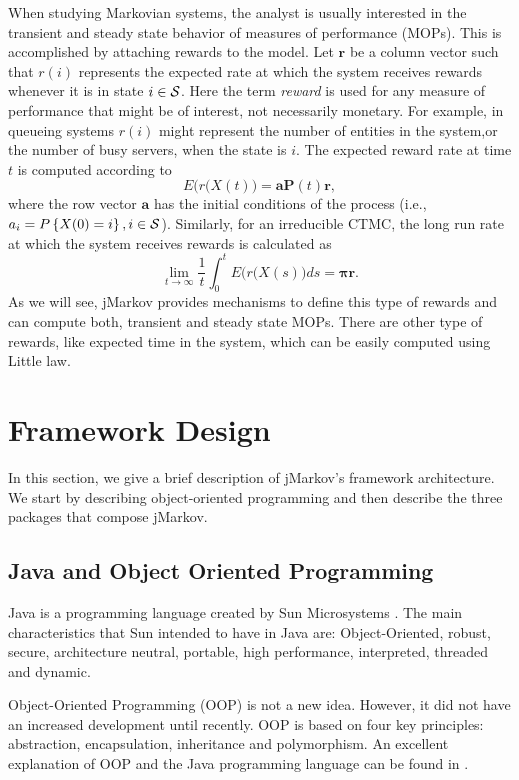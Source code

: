 \documentclass[11pt,letterpaper]{article}
\newcommand{\bP}{{\mathbf P}}
\newcommand{\ba}{{\mathbf a}}
\newcommand{\bpi}{{\boldsymbol{\pi}}}
\newcommand{\cS}{{\cal S}}
\renewcommand{\Pr}[1]{P\left\{#1\right\}}
\newcommand{\br}{\mathbf{r}}
\begin{document}
When studying Markovian systems, the analyst is usually interested in the
transient and steady state behavior of measures of performance (MOPs).  This is
accomplished by attaching rewards to the model.  Let $\br$ be a column vector
such that $r(i)$ represents the expected rate at which the system receives
rewards whenever it is in state $i\in\cS$.  Here the term \emph{reward} is used
for any measure of performance that might be of interest, not necessarily
monetary.  For example, in queueing systems $r(i)$ might represent the number of
entities in the system,or the number of busy servers, when the state is $i$.
The expected reward rate at time $t$ is computed according to
\[ E\big(r(X(t)\big) = \ba\bP(t)\br,\]
where the row vector $\ba$ has the initial conditions of the process (i.e.,
$a_i=\Pr{X(0)=i},i\in\cS$).  Similarly, for an irreducible CTMC, the long run
rate at which the system receives rewards is calculated as
\[\lim_{t\rightarrow\infty} \frac1t\int_0^t E\big(r(X(s)\big) ds = \bpi
\br.\]
As we will see, jMarkov provides mechanisms to define this type of rewards and
can compute both, transient and steady state MOPs.  There are other type of
rewards, like expected time in the system, which can be easily computed using
Little law.


\section{Framework Design}\label{sec:Design}
In this section, we give a brief description of jMarkov's framework
architecture.  We start by describing object-ori\-ented programming and then
describe the three packages that compose jMarkov.


\subsection{Java and Object Oriented Programming}\label{sec:OOP}


Java is a programming language created by Sun Microsystems \cite{sun06}.  The
main characteristics that Sun intended to have in Java are: Object-Oriented,
robust, secure, architecture neutral, portable, high performance, interpreted,
threa\-ded and dynamic.

Object-Oriented Programming  (OOP)
is not a new idea.  However, it did not have an increased development until
recently. OOP is based on four key principles: abstraction, encapsulation,
inheritance and polymorphism. An excellent explanation of OOP and the Java
programming language can be found in \cite{lind04}.
\end{document}
